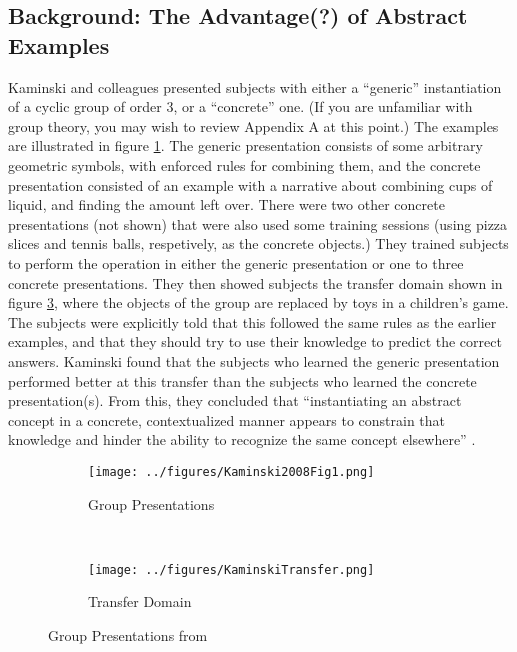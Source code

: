 \documentclass[11pt]{article}
\begin{document}
\subsection{Background: The Advantage(?) of Abstract Examples}
Kaminski and colleagues \cite{Kaminski2008} presented subjects with either a ``generic'' instantiation of a cyclic group of order 3, or a ``concrete'' one. (If you are unfamiliar with group theory, you may wish to review Appendix A at this point.) The examples are illustrated in figure \ref{kaminskitraining}. The generic presentation consists of some arbitrary geometric symbols, with enforced rules for combining them, and the concrete presentation consisted of an example with a narrative about combining cups of liquid, and finding the amount left over. There were two other concrete presentations (not shown) that were also used some training sessions (using pizza slices and tennis balls, respetively, as the concrete objects.) They trained subjects to perform the operation in either the generic presentation or one to three concrete presentations. They then showed subjects the transfer domain shown in figure \ref{kaminskitransfer}, where the objects of the group are replaced by toys in a children's game. The subjects were explicitly told that this followed the same rules as the earlier examples, and that they should try to use their knowledge to predict the correct answers. Kaminski found that the subjects who learned the generic presentation performed better at this transfer than the subjects who learned the concrete presentation(s). From this, they concluded that ``instantiating an abstract concept in a concrete, contextualized manner appears to constrain that knowledge and hinder the ability to recognize the same concept elsewhere'' \cite{Kaminski2008}. \\[11pt]
\begin{figure} \centering \begin{subfigure}{0.5\textwidth} \caption{Group Presentations} \label{kaminskitraining} \texttt{[image: ../figures/Kaminski2008Fig1.png]} \end{subfigure} \\ \begin{subfigure}{0.5\textwidth} \caption{Transfer Domain} \label{kaminskitransfer} \texttt{[image: ../figures/KaminskiTransfer.png]} \end{subfigure} \caption{Group Presentations from \cite{Kaminski2008}} \end{figure}
\end{document}
